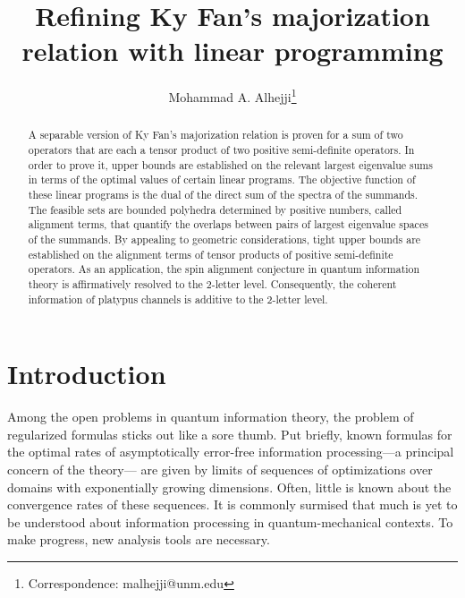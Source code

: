 \documentclass[12pt]{article}
\theoremstyle{definition}
\numberwithin{equation}{section}
\numberwithin{equation}{section}
\begin{document}
\title{Refining Ky Fan's majorization relation with linear programming}


\author{Mohammad A. Alhejji\footnote{Correspondence: malhejji@unm.edu}}


\maketitle
\begin{abstract}
A separable version of Ky Fan's majorization relation is proven for a sum of two operators that are each a tensor product of two positive semi-definite operators. In order to prove it, upper bounds are established on the relevant largest eigenvalue sums in terms of the optimal values of certain linear programs. The objective function of these linear programs is the dual of the direct sum of the spectra of the summands. The feasible sets are bounded polyhedra determined by positive numbers, called alignment terms, that quantify the overlaps between pairs of largest eigenvalue spaces of the summands. By appealing to geometric considerations, tight upper bounds are established on the alignment terms of tensor products of positive semi-definite operators. As an application, the spin alignment conjecture in quantum information theory is affirmatively resolved to the 2-letter level. Consequently, the coherent information of platypus channels is additive to the 2-letter level. 
\end{abstract}

\section{Introduction}
\label{sec: intro}
Among the open problems in quantum information theory, the problem of regularized formulas sticks out like a sore thumb. Put briefly, known formulas for the optimal rates of asymptotically error-free information processing---a principal concern of the theory--- are given by limits of sequences of optimizations over domains with exponentially growing dimensions. Often, little is known about the convergence rates of these sequences. It is commonly surmised that much is yet to be understood about information processing in quantum-mechanical contexts. To make progress, new analysis tools are necessary. 
\end{document}
